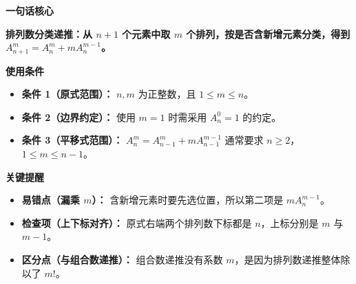 \begin{summarybox}
\textbf{\textcolor{CSummary}{一句话核心}}

\textbf{排列数分类递推：从 $n+1$ 个元素中取 $m$ 个排列，按是否含新增元素分类，得到 $A_{n+1}^m=A_n^m+mA_n^{m-1}$。}

\medskip
\textbf{\textcolor{CSummary}{使用条件}}
\begin{itemize}[leftmargin=*, itemsep=0.5em, topsep=0.4em]
    \item \textbf{条件 1（原式范围）：} $n,m$ 为正整数，且 $1\leq m\leq n$。
    \item \textbf{条件 2（边界约定）：} 使用 $m=1$ 时需采用 $A_n^0=1$ 的约定。
    \item \textbf{条件 3（平移式范围）：} $A_n^m=A_{n-1}^m+mA_{n-1}^{m-1}$ 通常要求 $n\geq2$，$1\leq m\leq n-1$。
\end{itemize}

\medskip
\textbf{\textcolor{CSummary}{关键提醒}}
\begin{itemize}[leftmargin=*, itemsep=0.5em, topsep=0.4em]
    \item \textbf{易错点（漏乘 $m$）：} 含新增元素时要先选位置，所以第二项是 $mA_n^{m-1}$。
    \item \textbf{检查项（上下标对齐）：} 原式右端两个排列数下标都是 $n$，上标分别是 $m$ 与 $m-1$。
    \item \textbf{区分点（与组合数递推）：} 组合数递推没有系数 $m$，是因为排列数递推整体除以了 $m!$。
\end{itemize}
\end{summarybox}
